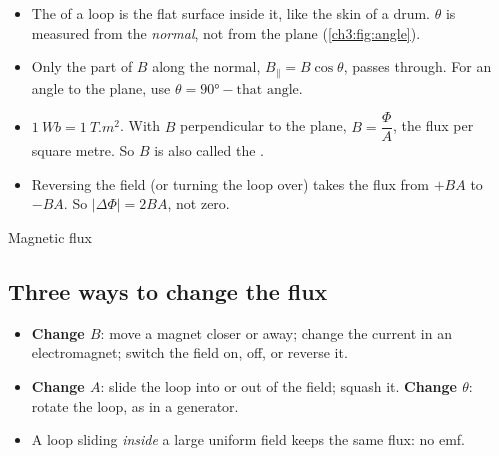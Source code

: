 \begin{itemize}
  \item The  of a loop is the flat surface inside it, like the skin of a
        drum. $\theta$ is measured from the \emph{normal}, not from the plane
        (\cref{ch3:fig:angle}).
  \item Only the part of $B$ along the normal, $B_\parallel = B\cos\theta$, passes
        through. For an angle to the plane, use $\theta = \ang{90} - \text{that angle}$.
  \item $\qty{1}{Wb} = \qty{1}{T.m^2}$. With $B$ perpendicular to the plane,
        $B = \dfrac{\Phi}{A}$, the flux per square metre. So $B$ is also called the
        .
  \item Reversing the field (or turning the loop over) takes the flux from $+BA$ to
        $-BA$. So $\lvert\Delta\Phi\rvert = 2BA$, not zero.
\end{itemize}


\begin{formulacard}{Magnetic flux}
  \begin{symbols}
  \end{symbols}
\end{formulacard}

\subsection{Three ways to change the flux}
\begin{itemize}
  \item \textbf{Change $B$}: move a magnet closer or away; change the current in an
        electromagnet; switch the field on, off, or reverse it.
  \item \textbf{Change $A$}: slide the loop into or out of the field; squash it.
        \textbf{Change $\theta$}: rotate the loop, as in a generator.
  \item A loop sliding \emph{inside} a large uniform field keeps the same flux: no emf.
\end{itemize}

